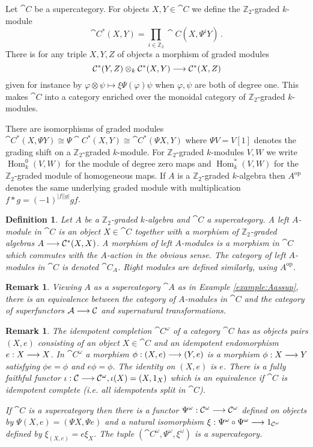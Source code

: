 \documentclass[english,letter paper,12pt,leqno]{article}
\theoremstyle{example}
\newtheorem{definition}[theorem]{Definition}
\newtheorem{remark}[theorem]{Remark}
\numberwithin{equation}{section}
\def\Hom{\operatorname{Hom}}
\begin{document}
Let $\cat{C}$ be a supercategory. For objects $X,Y \in \cat{C}$ we define the $\mathbb{Z}_2$-graded $k$-module
\[
\cat{C}^*(X,Y) = \prod_{i \in \mathbb{Z}_2} \cat{C}(X, \Psi^i Y)\,.
\]
There is for any triple $X,Y,Z$ of objects a morphism of graded modules
\[
\mathcal{C}^*(Y,Z) \otimes_k \mathcal{C}^*(X, Y) \longrightarrow \mathcal{C}^*(X,Z)
\]
given for instance by $\varphi \otimes \psi \mapsto \xi \Psi( \varphi ) \psi$ when $\varphi, \psi$ are both of degree one. This makes $\cat{C}$ into a category enriched over the monoidal category of $\mathbb{Z}_2$-graded $k$-modules.

There are isomorphisms of graded modules $\cat{C}^*(X, \Psi Y) \cong \Psi \cat{C}^*(X, Y) \cong \cat{C}^*(\Psi X, Y)$ where $\Psi V = V [1]$ denotes the grading shift on a $\mathbb{Z}_2$-graded $k$-module. For $\mathbb{Z}_2$-graded $k$-modules $V,W$ we write $\Hom^0_k(V, W)$ for the module of degree zero maps and $\Hom_k^*(V, W)$ for the $\mathbb{Z}_2$-graded module of homogeneous maps. If $A$ is a $\mathbb{Z}_2$-graded $k$-algebra then $A^{\operatorname{op}}$ denotes the same underlying graded module with multiplication $f * g = (-1)^{|f||g|} gf$.

\begin{definition} Let $A$ be a $\mathbb{Z}_2$-graded $k$-algebra and $\cat{C}$ a supercategory. A \emph{left $A$-module in $\cat{C}$} is an object $X \in \cat{C}$ together with a morphism of $\mathbb{Z}_2$-graded algebras $A \longrightarrow \mathcal{C}^*(X,X)$. A \emph{morphism} of left $A$-modules is a morphism in $\cat{C}$ which commutes with the $A$-action in the obvious sense. The category of left $A$-modules in $\cat{C}$ is denoted $\cat{C}_A$. Right modules are defined similarly, using $A^{\operatorname{op}}$.
\end{definition}

\begin{remark}\label{remark:supercat_idempcomp} Viewing $A$ as a supercategory $\cat{A}$ as in Example \ref{example:Aassup}, there is an equivalence between the category of $A$-modules in $\cat{C}$ and the category of superfunctors $\mathcal{A} \longrightarrow \mathcal{C}$ and supernatural transformations.
\end{remark}

\begin{remark}\label{remark:idempotent_completion} The \emph{idempotent completion} $\cat{C}^\omega$ of a category $\cat{C}$ has as objects pairs $(X,e)$ consisting of an object $X \in \cat{C}$ and an idempotent endomorphism $e: X \longrightarrow X$. In $\cat{C}^\omega$ a morphism $\phi: (X,e) \longrightarrow (Y,e)$ is a morphism $\phi: X \longrightarrow Y$ satisfying $\phi e = \phi$ and $e \phi = \phi$. The identity on $(X,e)$ is $e$. There is a fully faithful functor $\iota: \mathcal{C} \longrightarrow \mathcal{C}^{\omega}, \iota(X) = (X,1_X)$ which is an equivalence if $\cat{C}$ is idempotent complete (i.e. all idempotents split in $\cat{C}$).

If $\cat{C}$ is a supercategory then there is a functor $\Psi^\omega: \mathcal{C}^\omega \longrightarrow \mathcal{C}^\omega$ defined on objects by $\Psi(X,e) = (\Psi X, \Psi e)$ and a natural isomorphism $\xi: \Psi^\omega \circ \Psi^\omega \longrightarrow 1_{\mathcal{C}^\omega}$ defined by $\xi_{(X,e)} = e \xi_X$. The tuple $(\cat{C}^\omega, \Psi^\omega, \xi^\omega)$ is a supercategory.
\end{remark}
\end{document}
